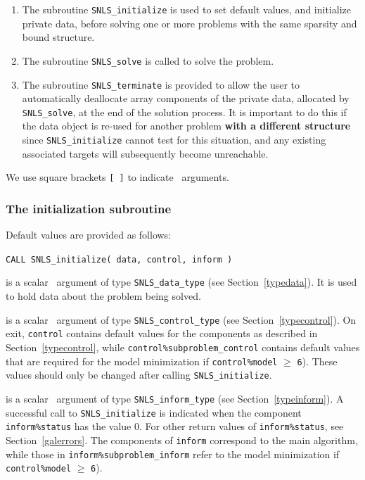 \documentclass{galahad}
\newcommand{\packagename}{SNLS}
\begin{document}
\begin{enumerate}
\item The subroutine
      {\tt \packagename\_initialize}
      is used to set default values, and initialize private data,
      before solving one or more problems with the
      same sparsity and bound structure.
\item The subroutine
      {\tt \packagename\_solve}
      is called to solve the problem.
\item The subroutine
      {\tt \packagename\_terminate}
      is provided to allow the user to automatically deallocate array
       components of the private data, allocated by
       {\tt \packagename\_solve},
       at the end of the solution process.
       It is important to do this if the data object is re-used for another
       problem {\bf with a different structure}
       since {\tt \packagename\_initialize} cannot test for this situation,
       and any existing associated targets will subsequently become unreachable.
\end{enumerate}
We use square brackets {\tt [ ]} to indicate \optional\ arguments.


\subsubsection{The initialization subroutine}\label{subinit}
 Default values are provided as follows:
\vspace*{1mm}

\hspace{8mm}
{\tt CALL \packagename\_initialize( data, control, inform )}

\vspace*{-3mm}
\begin{description}

 is a scalar \intentinout\ argument of type
{\tt \packagename\_data\_type}
(see Section~\ref{typedata}). It is used to hold data about the problem being
solved.

 is a scalar \intentout\ argument of type
{\tt \packagename\_control\_type}
(see Section~\ref{typecontrol}).
On exit, {\tt control} contains default values for the components as
described in Section~\ref{typecontrol}, while
{\tt control\%subproblem\_control} contains default values that are required for the
model minimization if {\tt control\%model} $\geq$ {\tt 6}).
These values should only be changed after calling
{\tt \packagename\_initialize}.

 is a scalar \intentout\ argument of type
{\tt \packagename\_inform\_type}
(see Section~\ref{typeinform}). A successful call to
{\tt \packagename\_initialize}
is indicated when the  component {\tt inform\%status} has the value 0.
For other return values of {\tt inform\%status}, see
Section~\ref{galerrors}.
The components of {\tt inform} correspond to the main algorithm, while
those in {\tt inform\%subproblem\_inform} refer to the model minimization
if {\tt control\%model} $\geq$ {\tt 6}).

\end{description}
\end{document}
